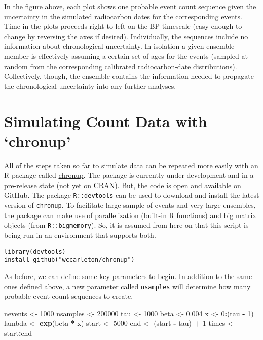 \documentclass[]{article}
\newenvironment{Shaded}{\begin{snugshade}}{\end{snugshade}}
\newcommand{\KeywordTok}[1]{\textcolor[rgb]{0.13,0.29,0.53}{\textbf{#1}}}
\newcommand{\DecValTok}[1]{\textcolor[rgb]{0.00,0.00,0.81}{#1}}
\newcommand{\FloatTok}[1]{\textcolor[rgb]{0.00,0.00,0.81}{#1}}
\newcommand{\StringTok}[1]{\textcolor[rgb]{0.31,0.60,0.02}{#1}}
\newcommand{\OperatorTok}[1]{\textcolor[rgb]{0.81,0.36,0.00}{\textbf{#1}}}
\newcommand{\NormalTok}[1]{#1}
\begin{document}
In the figure above, each plot shows one probable event count sequence
given the uncertainty in the simulated radiocarbon dates for the
corresponding events. Time in the plots proceeds right to left on the BP
timescale (easy enough to change by reversing the axes if desired).
Individually, the sequences include no information about chronological
uncertainty. In isolation a given ensemble member is effectively
assuming a certain set of ages for the events (sampled at random from
the corresponding calibrated radiocarbon-date distributions).
Collectively, though, the ensemble contains the information needed to
propagate the chronological uncertainty into any further analyses.

\section{\texorpdfstring{Simulating Count Data with
`chronup'}{Simulating Count Data with chronup}}\label{simulating-count-data-with-chronup}

All of the steps taken so far to simulate data can be repeated more
easily with an R package called
\href{https://github.com/wccarleton/chronup}{chronup}. The package is
currently under development and in a pre-release state (not yet on
CRAN). But, the code is open and available on GitHub. The package
\texttt{R::devtools} can be used to download and install the latest
version of \texttt{chronup}. To facilitate large sample of events and
very large ensembles, the package can make use of parallelization
(built-in R functions) and big matrix objects (from
\texttt{R::bigmemory}). So, it is assumed from here on that this script
is being run in an environment that supports both.

\begin{verbatim}
library(devtools)
install_github("wccarleton/chronup")
\end{verbatim}

As before, we can define some key parameters to begin. In addition to
the same ones defined above, a new parameter called \texttt{nsamples}
will determine how many probable event count sequences to create.

\begin{Shaded}
\begin{Highlighting}[]
\NormalTok{nevents <-}\StringTok{ }\DecValTok{1000}
\NormalTok{nsamples <-}\StringTok{ }\DecValTok{200000}
\NormalTok{tau <-}\StringTok{ }\DecValTok{1000}
\NormalTok{beta <-}\StringTok{ }\FloatTok{0.004}
\NormalTok{x <-}\StringTok{ }\DecValTok{0}\OperatorTok{:}\NormalTok{(tau }\OperatorTok{-}\StringTok{ }\DecValTok{1}\NormalTok{)}
\NormalTok{lambda <-}\StringTok{ }\KeywordTok{exp}\NormalTok{(beta }\OperatorTok{*}\StringTok{ }\NormalTok{x)}
\NormalTok{start <-}\StringTok{ }\DecValTok{5000}
\NormalTok{end <-}\StringTok{ }\NormalTok{(start }\OperatorTok{-}\StringTok{ }\NormalTok{tau) }\OperatorTok{+}\StringTok{ }\DecValTok{1}
\NormalTok{times <-}\StringTok{ }\NormalTok{start}\OperatorTok{:}\NormalTok{end}
\end{Highlighting}
\end{Shaded}
\end{document}
